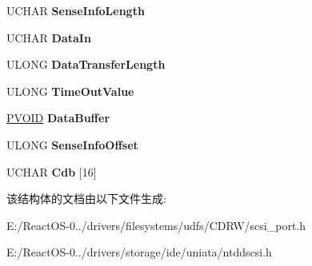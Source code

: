 \begin{DoxyCompactItemize}
\mbox{\label{struct___s_c_s_i___p_a_s_s___t_h_r_o_u_g_h___d_i_r_e_c_t_a287d40847fb3d7c3d4bf320aad59e93c}} 
U\+C\+H\+AR {\bfseries Sense\+Info\+Length}
\item 
\mbox{\label{struct___s_c_s_i___p_a_s_s___t_h_r_o_u_g_h___d_i_r_e_c_t_ab79a755806b7649632bb74ceeddd0bf5}} 
U\+C\+H\+AR {\bfseries Data\+In}
\item 
\mbox{\label{struct___s_c_s_i___p_a_s_s___t_h_r_o_u_g_h___d_i_r_e_c_t_aac03accc52875b43644f634e4a1d74b0}} 
U\+L\+O\+NG {\bfseries Data\+Transfer\+Length}
\item 
\mbox{\label{struct___s_c_s_i___p_a_s_s___t_h_r_o_u_g_h___d_i_r_e_c_t_a4f5b6966d1a94e4747fe4c29ac6477c2}} 
U\+L\+O\+NG {\bfseries Time\+Out\+Value}
\item 
\mbox{\label{struct___s_c_s_i___p_a_s_s___t_h_r_o_u_g_h___d_i_r_e_c_t_ad25cab3a4f6431c0c53cc3312ddfe4a9}} 
\hyperlink{interfacevoid}{P\+V\+O\+ID} {\bfseries Data\+Buffer}
\item 
\mbox{\label{struct___s_c_s_i___p_a_s_s___t_h_r_o_u_g_h___d_i_r_e_c_t_a41684a36095f73cca5f584d4a4e07b2b}} 
U\+L\+O\+NG {\bfseries Sense\+Info\+Offset}
\item 
\mbox{\label{struct___s_c_s_i___p_a_s_s___t_h_r_o_u_g_h___d_i_r_e_c_t_ac0d7cf1884c069d3bf3cd64068b7cc5d}} 
U\+C\+H\+AR {\bfseries Cdb} \mbox{[}16\mbox{]}
\end{DoxyCompactItemize}


该结构体的文档由以下文件生成\+:\begin{DoxyCompactItemize}
\item 
E\+:/\+React\+O\+S-\/0../drivers/filesystems/udfs/\+C\+D\+R\+W/scsi\+\_\+port.\+h\item 
E\+:/\+React\+O\+S-\/0../drivers/storage/ide/uniata/ntddscsi.\+h\end{DoxyCompactItemize}
